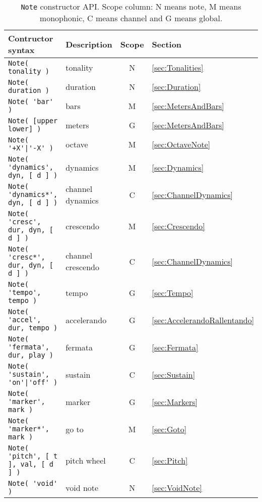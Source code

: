 \documentclass{article}
\newcommand{\note}{\lstinline!Note!\xspace}
\begin{document}
\begin{table}
	\centering
	\begin{tabular}{llcl}
		Contructor syntax & Description & Scope & Section \\
		\hline
		\lstinline!Note( tonality )! & tonality & N & \ref{sec:Tonalities} \\
		\lstinline!Note( duration )! & duration & N & \ref{sec:Duration} \\
		\lstinline!Note( 'bar' )! & bars & M & \ref{sec:MetersAndBars} \\
		\lstinline!Note( [upper lower] )! & meters & G & \ref{sec:MetersAndBars} \\
		\lstinline!Note( '+X'|'-X' )! & octave & M & \ref{sec:OctaveNote} \\
		\lstinline!Note( 'dynamics', dyn, [ d ] )! & dynamics & M & \ref{sec:Dynamics} \\
		\lstinline!Note( 'dynamics*', dyn, [ d ] )! & channel dynamics & C & \ref{sec:ChannelDynamics} \\
		\lstinline!Note( 'cresc', dur, dyn, [ d ] )! & crescendo & M & \ref{sec:Crescendo} \\
		\lstinline!Note( 'cresc*', dur, dyn, [ d ] )! & channel crescendo & C & \ref{sec:ChannelDynamics} \\
		\lstinline!Note( 'tempo', tempo )! & tempo & G & \ref{sec:Tempo} \\
		\lstinline!Note( 'accel', dur, tempo )! & accelerando & G & \ref{sec:AccelerandoRallentando} \\
		\lstinline!Note( 'fermata', dur, play )! & fermata & G & \ref{sec:Fermata} \\
		\lstinline!Note( 'sustain', 'on'|'off' )! & sustain & C & \ref{sec:Sustain} \\
		\lstinline!Note( 'marker', mark )! & marker & G & \ref{sec:Markers} \\
		\lstinline!Note( 'marker*', mark )! & go to & M & \ref{sec:Goto} \\
		\lstinline!Note( 'pitch', [ t ], val, [ d ] )! & pitch wheel & C & \ref{sec:Pitch} \\
		\lstinline!Note( 'void' )! & void note & N & \ref{sec:VoidNote} \\
	\end{tabular}
	\caption[\note constructor API]{\note constructor API. Scope column: N means note, M means monophonic, C means channel and G means global.}
	\label{tab:NoteAPI}
\end{table}
\end{document}
